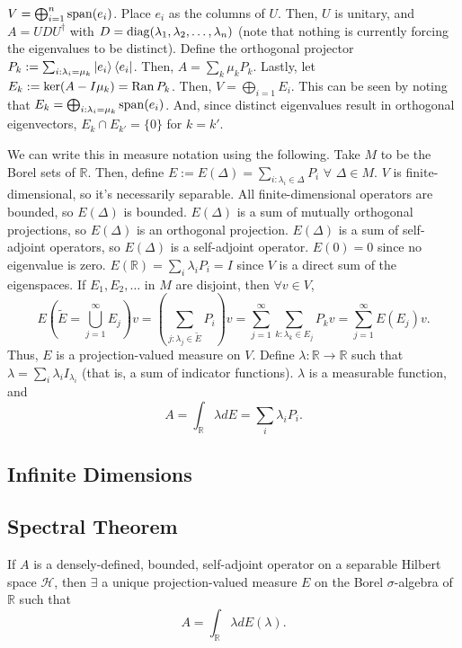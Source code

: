 	$V = \bigoplus_{i=1}^n \operatorname{span}(e_i)$. Place $e_i$ as the columns of $U$. Then, $U$ is unitary, and $A = UDU^\dagger$ with $D=\operatorname{diag}(\lambda_1, \lambda_2, \dots, \lambda_n)$ (note that nothing is currently forcing the eigenvalues to be distinct). Define the orthogonal projector $P_k:=\sum_{i:\lambda_i=\mu_k} \ket{e_i}\bra{e_i}$. Then, $A = \sum_k \mu_k P_k.$ Lastly, let $E_k:=\ker(A-I\mu_k)=\operatorname{Ran} P_k$. Then, $V=\bigoplus_{i=1} E_i$. This can be seen by noting that $E_k = \bigoplus_{i: \lambda_i=\mu_k} \operatorname{span}(e_i)$. And, since distinct eigenvalues result in orthogonal eigenvectors, $E_k \cap E_{k'}=\{0\}$ for $k=k'$. 
	
	We can write this in measure notation using the following. Take $M$ to be the Borel sets of $\mathbb{R}$. Then, define $E:=E(\Delta) = \sum_{i: \lambda_i \in \Delta} P_i$ $\forall$ $\Delta\in M$. $V$ is finite-dimensional, so it's necessarily separable. All finite-dimensional operators are bounded, so $E(\Delta)$ is bounded. $E(\Delta)$ is a sum of mutually orthogonal projections, so $E(\Delta)$ is an orthogonal projection. $E(\Delta)$ is a sum of self-adjoint operators, so $E(\Delta)$ is a self-adjoint operator. $E(0) = 0$ since no eigenvalue is zero. $E(\mathbb{R})=\sum_i \lambda_iP_i=I$ since $V$ is a direct sum of the eigenspaces. If $E_1, E_2, \dots$ in $M$ are disjoint, then $\forall v\in V$,
	$$
		E\left(\tilde{E}=\bigcup_{j=1}^\infty E_j\right)v =\left(\sum_{j: \lambda_j\in\tilde{E}}P_i \right) v= \sum_{j=1}^\infty \sum_{k: \lambda_k \in E_j}P_k v= \sum_{j=1}^\infty E(E_j)v.
	$$
	Thus, $E$ is a projection-valued measure on $V$. Define $\lambda: \mathbb{R}\rightarrow\mathbb{R}$ such that $\lambda = \sum_i \lambda_i I_{\lambda_i}$ (that is, a sum of indicator functions). $\lambda$ is a measurable function, and
	$$
		A = \int_\mathbb{R} \lambda dE = \sum_i \lambda_i P_i.
	$$
	

\subsection{Infinite Dimensions}
\subsection{Spectral Theorem}
	If $A$ is a densely-defined, bounded, self-adjoint operator on a separable Hilbert space $\mathcal{H}$, then $\exists$ a unique projection-valued measure $E$ on the Borel $\sigma$-algebra of $\mathbb{R}$ such that
	$$
		A = \int_\mathbb{R} \lambda dE(\lambda).
	$$